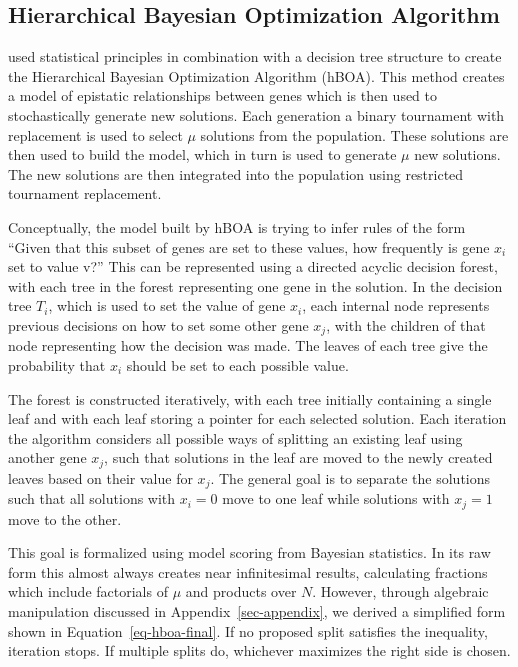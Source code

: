 \documentclass[twoside]{article}
\begin{document}
\subsection{Hierarchical Bayesian Optimization Algorithm}

\cite{pelikan:2006:hboa} used statistical principles in combination with a decision tree structure
to create the Hierarchical Bayesian Optimization Algorithm (hBOA). This method creates a model of
epistatic relationships between genes which is then used to stochastically generate new solutions.
Each generation a binary tournament with replacement is used to select $\mu$ solutions from
the population. These solutions are then used to build the model, which in turn is used to generate $\mu$ new
solutions. The new solutions are then integrated into the population using restricted tournament
replacement.

Conceptually, the model built by hBOA is trying to infer rules of the form ``Given that this
subset of genes are set to these values, how frequently is gene $x_i$ set to value v?'' This can
be represented using a directed acyclic decision forest, with each tree in the forest representing one gene
in the solution. In the decision tree $T_i$, which is used to set the value of gene $x_i$,
each internal node represents previous decisions on how to set
some other gene $x_j$, with the children of that node representing how the decision was made. The
leaves of each tree give the probability that $x_i$ should be set to each possible value.

The forest is constructed iteratively, with each tree initially containing a single leaf
and with each leaf storing a pointer for each selected solution. Each iteration the algorithm considers
all possible ways of splitting an existing leaf using another gene $x_j$, such that solutions in the
leaf are moved to the newly created leaves based on their value for $x_j$. The general goal is to
separate the solutions such that all solutions with $x_i = 0$ move to one leaf while solutions with
$x_j = 1$ move to the other.

This goal is formalized using model scoring from Bayesian statistics. In its raw form this
almost always creates near infinitesimal results, calculating fractions which include factorials of $\mu$
and products over $N$. However, through algebraic manipulation discussed in Appendix~\ref{sec-appendix}, we
derived a simplified form shown in Equation~\ref{eq-hboa-final}. If no proposed split satisfies the inequality, iteration stops.
If multiple splits do, whichever maximizes the right side is chosen.
\end{document}
